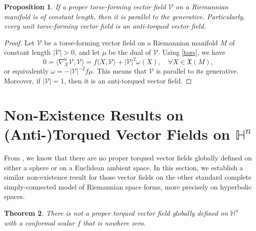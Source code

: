 \documentclass[12pt]{amsart}
\def\h{\mathbb H}
\newtheorem{theorem}{Theorem}[section]
\newtheorem{proposition}[theorem]{Proposition}
\theoremstyle{definition}
\begin{document}
\begin{proposition}\label{tors-cons}
If a proper torse-forming vector field $\mathcal{V}$ on a Riemannian manifold is of constant length, then it is parallel to the generative. Particularly, every unit torse-forming vector field is an anti-torqued vector field. 
\end{proposition}
\begin{proof}
Let $\mathcal{V}$ be a torse-forming vector field on a Riemannian manifold $M$ of constant length $|\mathcal{V}|>0$, and let $\mu$ be the dual of $\mathcal{V}$.  Using \eqref{tors}, we have
\begin{equation*}
 0=\langle \nabla^0_X\mathcal{V} , \mathcal{V} \rangle =f \langle X, \mathcal{V} \rangle +|\mathcal{V}|^{2}\omega(X),   \quad \forall X\in \mathfrak{X}(M),
\end{equation*}
or equivalently $\omega=-|\mathcal{V}|^{-2}f  \mu.$ This means that $\mathcal{V}$ is parallel to its generative. Moreover, if $|\mathcal{V}|=1$, then it is an anti-torqued vector field.
\end{proof}

\section{Non-Existence Results on (Anti-)Torqued Vector Fields on $\h^n$} \label{char}

From \cite{dta}, we know that there are no proper torqued vector fields globally defined on either a sphere or on a Euclidean ambient space. In this section, we establish a similar non-existence result for those vector fields on the other standard complete simply-connected model of Riemannian space forms, more precisely on hyperbolic spaces.

\begin{theorem} \label{torq-hyp-nonexis}
There is not a proper torqued vector field globally defined on $\h^n$ with a conformal scalar $f$ that is nowhere zero.
\end{theorem}
\end{document}
